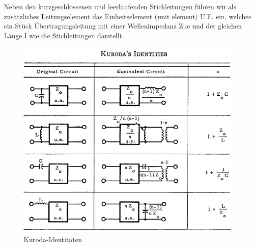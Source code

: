 Neben den kurzgeschlossenen und leerlaufenden Stichleitungen f\"uhren wir  als
zus\"atzliches  Leitungselement  das  Einheitselement (unit element) U.E. ein,
welches ein St\"uck \"Ubertragungsleitung mit einer Wellenimpedanz Zue und der
gleichen L\"ange I wie die Stichleitungen darstellt.

\begin{figure}[h!]
    \centering
    \includegraphics[width=\imagewidth]{images/kuroda-identities}
    \caption{Kuroda-Identit\"aten}
    \label{fig:kuroda-identities}
\end{figure}

